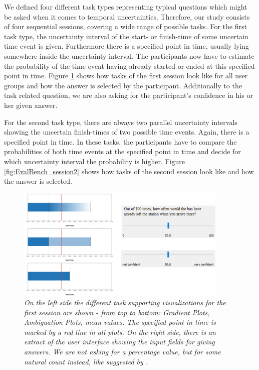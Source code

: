 We defined four different task types representing typical questions which might be asked when it comes to temporal uncertainties. Therefore, our study consists of four sequential sessions, covering a wide range of possible tasks. For the first task type, the uncertainty interval of the start- or finish-time of some uncertain time event is given. Furthermore there is a specified point in time, usually lying somewhere inside the uncertainty interval. The participants now have to estimate the probability of the time event having already started or ended at this specified point in time. Figure \ref{fig:EvalBench_session1} shows how tasks of the first session look like for all user groups and how the answer is selected by the participant. Additionally to the task related question, we are also asking for the participant's confidence in his or her given answer. \par \medskip

For the second task type, there are always two parallel uncertainty intervals showing the uncertain finish-times of two possible time events. Again, there is a specified point in time. In these tasks, the participants have to compare the probabilities of both time events at the specified point in time and decide for which uncertainty interval the probability is higher. Figure \ref{fig:EvalBench_session2} shows how tasks of the second session look like and how the answer is selected. \par \medskip

\begin{figure}[H]
	\centering
	\includegraphics[width=0.9\textwidth]{figures/EvalBench_session1.png}
	\caption{\textit{On the left side the different task supporting visualizations for the first session are shown - from top to bottom: Gradient Plots, Ambiguation Plots, mean values. The specified point in time is marked by a red line in all plots. On the right side, there is an extract of the user interface showing the input fields for giving answers. We are not asking for a percentage value, but for some natural count instead, like suggested by \citet{hullman2016evaluating}.}}
	\label{fig:EvalBench_session1}
\end{figure}


